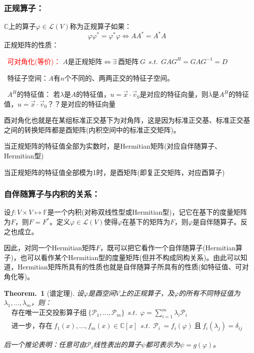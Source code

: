 \documentclass[zihao=-4,UTF8]{report}
\theoremstyle{mystyle} %
\newtheorem{theorem}{Theorem.\,}
\begin{document}
\subsubsection{正规算子：}
$\mathbb{C}$上的算子$\varphi \in \mathscr{L}(V)$称为正规算子如果：
\begin{equation*}
    \varphi\varphi^* = \varphi^*\varphi \Longleftrightarrow AA^* = A^*A
\end{equation*}
正规矩阵的性质：
\par{}\  \textcolor{red}{可对角化(等价)：} $A$是正规矩阵$\Longleftrightarrow \exists\ \text{酉矩阵}\ G \ \ s.t.\ \ GAG^H = GAG^{-1} = D $  \par
{}\   特征子空间：$A$有$n$个不同的、两两正交的特征子空间。  \par
{}\  $A^H$的特征值： 若$\lambda$是$A$的特征值，$u = \vec{x}\cdot\vec{v}_0$是对应的特征向量，则$\overline{\lambda}$是$A^H$的特征值，$u = \vec{x}\cdot\vec{v}_0$？？是对应的特征向量  \par

{\par\color{gray}\small
酉对角化也就是在某组标准正交基下为对角阵，这是因为标准正交基、标准正交基之间的转换矩阵都是酉矩阵(内积空间中的标准正交矩阵)。\par
当正规矩阵的特征值全部为实数时，是Hermitian矩阵(对应自伴随算子、Hermitian型)\par
当正规矩阵的特征值全部模为1时，是酉矩阵(即复正交矩阵，对应酉算子)
\par}

\subsubsection{自伴随算子与内积的关系：}
设$f: V\times V \longmapsto \mathbb{F}$是一个内积(对称双线性型或Hermitian型)，记它在基下的度量矩阵为$F$，则$F = F^*$。定义$\varphi \in \mathscr{L}(V)$使得$\varphi$在基下的矩阵为$F$，则$\varphi$是自伴随算子。反之也成立。

因此，对同一个Hermitian矩阵$F$，既可以把它看作一个自伴随算子(Hermitian算子)，也可以看作某个Hermitian型的度量矩阵(但并不构成同构关系)。由此可以知道，Hermitian矩阵所具有的性质也就是自伴随算子所具有的性质(如特征值、可对角化等)。


\begin{theorem}[谱定理]\label{谱定理}
设$\varphi$是酉空间$V$上的正规算子，及$\varphi$的所有不同特征值为$\lambda_1,...,\lambda_m$，则：
\begin{gather*}
    \text{存在唯一正交投影算子组}\  \{\mathscr{P}_1,...,\mathscr{P}_m\}\ \ s.t. \ \ \varphi = \sum_{i=1}^{m}\lambda_i\mathscr{P}_i\\
    \text{进一步，存在}\ f_1(x),...,f_m(x) \in \mathbb{C}[x]\ \ s.t.\ \ \mathscr{P}_i\ = f_i(\varphi)\ \text{且}\ f_i(\lambda_j) = \delta_{ij}
\end{gather*}
{\par\color{gray}\small
后一个推论表明：任意可由$\mathscr{P}_i$线性表出的算子$\psi$都可表示为$\psi = g(\varphi)$。
\par}

\end{theorem}
\end{document}
